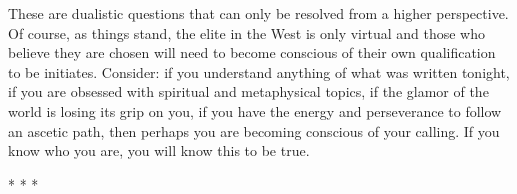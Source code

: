 These are dualistic questions that can only be resolved from a higher perspective. Of course, as things stand, the elite in the West is only virtual and those who believe they are chosen will need to become conscious of their own qualification to be initiates. Consider: if you understand anything of what was written tonight, if you are obsessed with spiritual and metaphysical topics, if the glamor of the world is losing its grip on you, if you have the energy and perseverance to follow an ascetic path, then perhaps you are becoming conscious of your calling. If you know who you are, you will know this to be true.



\begin{center}* * *\end{center}

